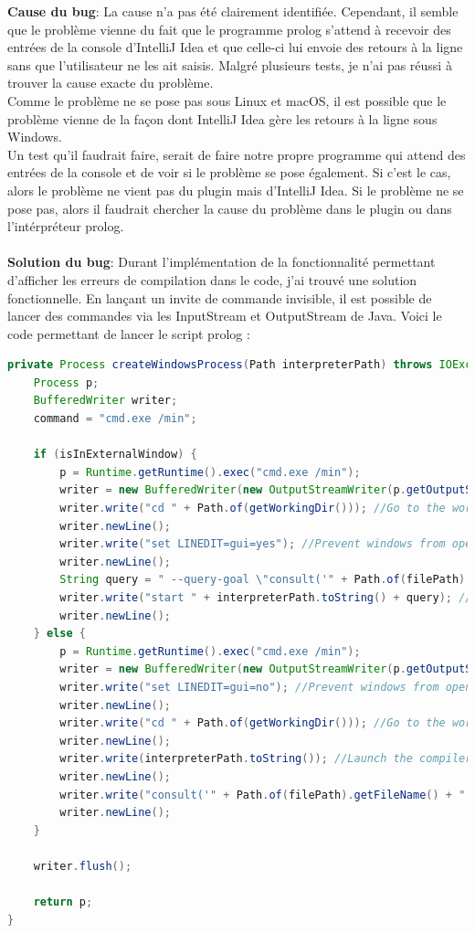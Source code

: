 \noindent \textbf{Cause du bug}: La cause n'a pas été clairement identifiée. Cependant, il semble que le problème vienne du fait que le programme prolog s'attend à recevoir des entrées de la console d'IntelliJ Idea et que celle-ci lui envoie des retours à la ligne sans que l'utilisateur ne les ait saisis. Malgré plusieurs tests, je n'ai pas réussi à trouver la cause exacte du problème.
\\
Comme le problème ne se pose pas sous Linux et macOS, il est possible que le problème vienne de la façon dont IntelliJ Idea gère les retours à la ligne sous Windows.
\\
Un test qu'il faudrait faire, serait de faire notre propre programme qui attend des entrées de la console et de voir si le problème se pose également. Si c'est le cas, alors le problème ne vient pas du plugin mais d'IntelliJ Idea. Si le problème ne se pose pas, alors il faudrait chercher la cause du problème dans le plugin ou dans l'intérpréteur prolog.
\\
\\
\textbf{Solution du bug}: Durant l'implémentation de la fonctionnalité permettant d'afficher les erreurs de compilation dans le code, j'ai trouvé une solution fonctionnelle.
\newdoubleline En lançant un invite de commande invisible, il est possible de lancer des commandes via les InputStream et OutputStream de Java. Voici le code permettant de lancer le script prolog :
\begin{lstlisting}[language=Java, caption={Code permettant de lancer le script prolog}, label={lst:run_script_prolog}]
private Process createWindowsProcess(Path interpreterPath) throws IOException {
    Process p;
    BufferedWriter writer;
    command = "cmd.exe /min";

    if (isInExternalWindow) {
        p = Runtime.getRuntime().exec("cmd.exe /min");
        writer = new BufferedWriter(new OutputStreamWriter(p.getOutputStream()));
        writer.write("cd " + Path.of(getWorkingDir())); //Go to the working directory
        writer.newLine();
        writer.write("set LINEDIT=gui=yes"); //Prevent windows from opening a console
        writer.newLine();
        String query = " --query-goal \"consult('" + Path.of(filePath).getFileName() + "')\"";
        writer.write("start " + interpreterPath.toString() + query); //Launch the compiler
        writer.newLine();
    } else {
        p = Runtime.getRuntime().exec("cmd.exe /min");
        writer = new BufferedWriter(new OutputStreamWriter(p.getOutputStream()));
        writer.write("set LINEDIT=gui=no"); //Prevent windows from opening a console
        writer.newLine();
        writer.write("cd " + Path.of(getWorkingDir())); //Go to the working directory
        writer.newLine();
        writer.write(interpreterPath.toString()); //Launch the compiler
        writer.newLine();
        writer.write("consult('" + Path.of(filePath).getFileName() + "').");
        writer.newLine();
    }

    writer.flush();

    return p;
}
\end{lstlisting}

